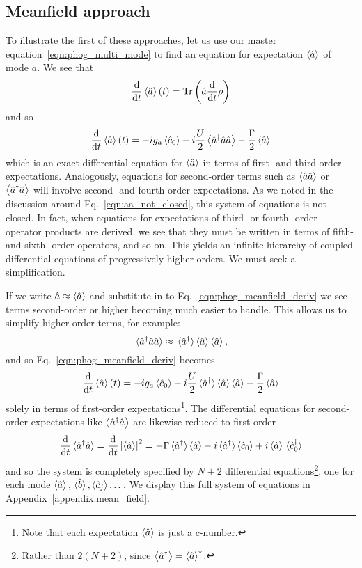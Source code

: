 \subsection{Meanfield approach}\label{sec:meanfield}
To illustrate the first of these approaches, let us use our master equation~\ref{eqn:phog_multi_mode} to find an equation for expectation $\ev{\hat{a}}$ of mode $a$. We see that
\begin{equation}
\ddt \ev{\hat{a}}\left(t\right) = \text{Tr}\left( \hat{a} \ddt \rho\right)
\end{equation}
and so
\begin{equation}\label{eqn:phog_meanfield_deriv}
\ddt \ev{\hat{a}}\left(t\right) = - i g_a \ev{\hat{c}_0} - i \frac{U}{2} \ev{\hat{a}^\dagger \hat{a}\hat{a}} - \frac{\Gamma}{2} \ev{\hat{a}}
\end{equation}
which is an exact differential equation for $\ev{\hat{a}}$ in terms of first- and third-order expectations. Analogously, equations for second-order terms such as $\ev{\hat{a}\hat{a}}$ or $\ev{\hat{a}^\dagger \hat{a}}$ will involve second- and fourth-order expectations. As we noted in the discussion around Eq.~\ref{eqn:aa_not_closed}, this system of equations is not closed. In fact, when equations for expectations of third- or fourth- order operator products are derived, we see that they must be written in terms of fifth- and sixth- order operators, and so on. This yields an infinite hierarchy of coupled differential equations of progressively higher orders. We must seek a simplification.

If we write $\hat{a} \approx \ev{\hat{a}}$ and substitute in to Eq.~\ref{eqn:phog_meanfield_deriv} we see terms second-order or higher becoming much easier to handle. This allows us to simplify higher order terms, for example:
\begin{equation}
\ev*{\hat{a}^\dagger \hat{a} \hat{a}} \approx \ev*{\hat{a}^\dagger} \ev{\hat{a}} \ev{\hat{a}},
\end{equation}
and so Eq.~\ref{eqn:phog_meanfield_deriv} becomes
\begin{equation}\label{eqn:phog_meanfield_deriv_1}
\ddt \ev{\hat{a}}\left(t\right) = - i g_a \ev{\hat{c}_0} - i \frac{U}{2} \ev*{\hat{a}^\dagger} \ev{\hat{a}} \ev{\hat{a}} - \frac{\Gamma}{2} \ev{\hat{a}}
\end{equation}
solely in terms of first-order expectations\footnote{Note that each expectation $\ev{\hat{a}}$ is just a c-number.}. The differential equations for second-order expectations like $\ev{\hat{a}^\dagger \hat{a}}$ are likewise reduced to first-order
\begin{equation}
\ddt \ev*{\hat{a}^\dagger \hat{a}} = \ddt \left|\ev{\hat{a}}\right|^2 =  - \Gamma \ev*{\hat{a}^\dagger}\ev{\hat{a}} - i \ev*{\hat{a}^\dagger}\ev{\hat{c}_0} + i \ev{\hat{a}}\ev*{\hat{c}_0^\dagger}
\end{equation}
and so the system is completely specified by $N+2$ differential equations\footnote{Rather than $2(N+2)$, since $\ev{\hat{a}^\dagger} = \ev{\hat{a}}^*$.}, one for each mode $\ev{\hat{a}}, \ev*{\hat{b}}, \ev{\hat{c}_j} \dots$. We display this full system of equations in Appendix~\ref{appendix:mean_field}. 


